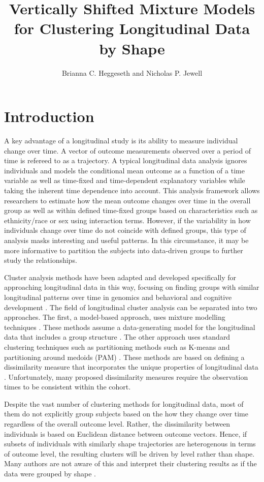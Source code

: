 \documentclass[12pt]{article}
\title{Vertically Shifted Mixture Models for Clustering Longitudinal Data by Shape}
\author{Brianna C. Heggeseth and Nicholas P. Jewell}
\begin{document}
\section{Introduction}
A key advantage of a longitudinal study is its ability to measure individual change over time. A vector of outcome measurements observed over a period of time is refereed to as a trajectory. A typical longitudinal data analysis ignores individuals and models the conditional mean outcome as a function of a time variable as well as time-fixed and time-dependent explanatory variables while taking the inherent time dependence into account. This analysis framework allows researchers to estimate how the mean outcome changes over time in the overall group as well as within defined time-fixed groups based on characteristics such as ethnicity/race or sex using interaction terms. However, if the variability in how individuals change over time do not coincide with defined groups, this type of analysis masks interesting and useful patterns. In this circumstance, it may be more informative to partition the subjects into data-driven groups to further study the relationships.

Cluster analysis methods have been adapted and developed specifically for approaching longitudinal data in this way, focusing on finding groups with similar longitudinal patterns over time in genomics and behavioral and cognitive development \cite{genolini2010, jones2001, muthen2010, mcnicholas2010,cruzmesia2008,ciampi2012}. The field of longitudinal cluster analysis can be separated into two approaches. The first, a model-based approach, uses mixture modelling techniques \cite{everitt1981,titterington1985,mclachlan1988,mclachlan2000,fruhwirth2006}. These methods assume a data-generating model for the longitudinal data that includes a group structure \cite{muthen2010,jones2001,leisch2004}. The other approach uses standard clustering techniques such as partitioning methods such as K-means \cite{macqueen1967,hartigan1979} and partitioning around medoids (PAM) \cite{kaufman1990}. These methods are based on defining a dissimilarity measure that incorporates the unique properties of longitudinal data \cite{genolini2010}.  Unfortunately, many proposed dissimilarity measures require the observation times to be consistent within the cohort. 

Despite the vast number of clustering methods for longitudinal data, most of them do not explicitly group subjects based on the how they change over time regardless of the overall outcome level. Rather, the dissimilarity between individuals is based on Euclidean distance between outcome vectors. Hence, if subsets of individuals with similarly shape trajectories are heterogenous in terms of outcome level, the resulting clusters will be driven by level rather than shape. Many authors are not aware of this and interpret their clustering results as if the data were grouped by shape \cite{pryor2011,carter2012,nagin1999}. 
\end{document}
